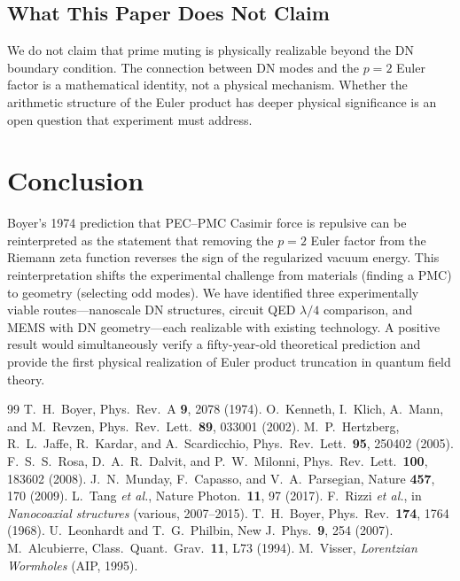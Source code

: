 \documentclass[aps,prd,twocolumn,superscriptaddress,nofootinbib]{revtex4-2}
\begin{document}
\subsection{What This Paper Does Not Claim}

We do not claim that prime muting is physically realizable
beyond the DN boundary condition.  The connection between
DN modes and the $p{=}2$ Euler factor is a mathematical
identity, not a physical mechanism.  Whether the arithmetic
structure of the Euler product has deeper physical significance
is an open question that experiment must address.

\section{Conclusion}

Boyer's 1974 prediction that PEC--PMC Casimir force is repulsive
can be reinterpreted as the statement that removing the $p{=}2$
Euler factor from the Riemann zeta function reverses the sign of
the regularized vacuum energy.  This reinterpretation shifts the
experimental challenge from materials (finding a PMC) to geometry
(selecting odd modes).  We have identified three experimentally
viable routes---nanoscale DN structures, circuit QED $\lambda/4$
comparison, and MEMS with DN geometry---each realizable with
existing technology.  A positive result would simultaneously
verify a fifty-year-old theoretical prediction and provide the
first physical realization of Euler product truncation in quantum
field theory.

\begin{thebibliography}{99}
 T.~H.~Boyer, Phys.\ Rev.\ A \textbf{9}, 2078 (1974).
 O.~Kenneth, I.~Klich, A.~Mann, and M.~Revzen, Phys.\ Rev.\ Lett.\ \textbf{89}, 033001 (2002).
 M.~P.~Hertzberg, R.~L.~Jaffe, R.~Kardar, and A.~Scardicchio, Phys.\ Rev.\ Lett.\ \textbf{95}, 250402 (2005).
 F.~S.~S.~Rosa, D.~A.~R.~Dalvit, and P.~W.~Milonni, Phys.\ Rev.\ Lett.\ \textbf{100}, 183602 (2008).
 J.~N.~Munday, F.~Capasso, and V.~A.~Parsegian, Nature \textbf{457}, 170 (2009).
 L.~Tang \textit{et al.}, Nature Photon.\ \textbf{11}, 97 (2017).
 F.~Rizzi \textit{et al.}, in \textit{Nanocoaxial structures} (various, 2007--2015).
 T.~H.~Boyer, Phys.\ Rev.\ \textbf{174}, 1764 (1968).
 U.~Leonhardt and T.~G.~Philbin, New J.\ Phys.\ \textbf{9}, 254 (2007).
 M.~Alcubierre, Class.\ Quant.\ Grav.\ \textbf{11}, L73 (1994).
 M.~Visser, \textit{Lorentzian Wormholes} (AIP, 1995).
\end{thebibliography}
\end{document}
